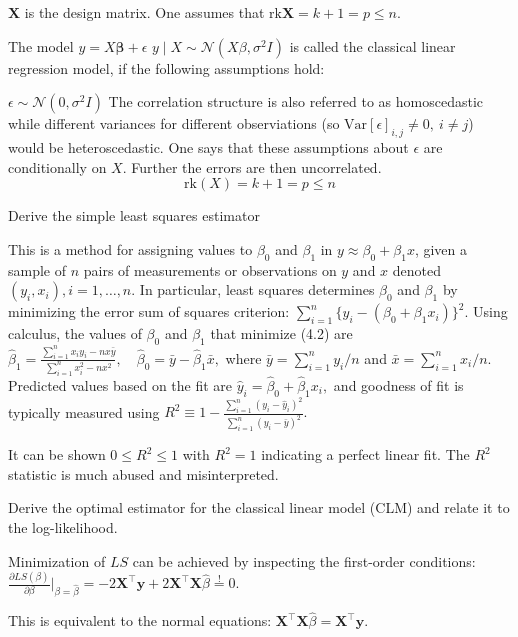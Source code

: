 \documentclass[11pt,a4paper,twoside]{article}
\begin{document}
\(\mathbf{X}\) is the design matrix. One assumes that \(\text{rk} \mathbf{X} = k + 1 = p \leq n\).


The model
\( y = X \boldsymbol{\beta} + \epsilon \)
\( y \mid X \sim \mathcal{N}(X\beta, \sigma^2 I)  \)
is called the classical linear regression model, if the following assumptions hold:

\( \epsilon \sim \mathcal{N}(0, \sigma^2 I) \)
The correlation structure is also referred to as homoscedastic
while different variances for different observiations (so \( \text{Var}[\epsilon]_{i,j} \neq 0,\ i \neq j \)) would be heteroscedastic.
One says that these assumptions about \( \epsilon \) are conditionally on \( X \).
Further the errors are then uncorrelated.
\[ \text{rk}(X) = k + 1 = p \leq n \]


Derive the simple least squares estimator

This is a method for assigning values to \(\beta_0\) and \(\beta_1\) in \( y \approx \beta_0 + \beta_1x \), 
given a sample of \(n\) pairs of measurements or observations on \(y\) and \(x\) denoted \((y_i, x_i), i = 1, \ldots, n.\)
In particular, least squares determines \(\beta_0\) and \(\beta_1\) by minimizing the error sum of squares criterion:
\(
\sum_{i=1}^{n} \{y_i - (\beta_0 + \beta_1 x_i)\}^2.
\)
Using calculus, the values of \(\beta_0\) and \(\beta_1\) that minimize (4.2) are 
\(
\hat{\beta}_1 = \frac{\sum_{i=1}^{n} x_i y_i - n x \bar{y}}{\sum_{i=1}^{n} x_i^2 - n x^2}, \quad \hat{\beta}_0 = \bar{y} - \hat{\beta}_1 \bar{x},
\)
where \(\bar{y} = \sum_{i=1}^{n} y_i / n\) and \(\bar{x} = \sum_{i=1}^{n} x_i / n\). 
Predicted values based on the fit are \(\hat{y}_i = \hat{\beta}_0 + \hat{\beta}_1 x_i,\) and goodness of fit is typically measured using
\(
R^2 \equiv 1 - \frac{\sum_{i=1}^{n} (y_i - \hat{y}_i)^2}{\sum_{i=1}^{n} (y_i - \bar{y})^2}.
\)

It can be shown \(0 \leq R^2 \leq 1\) with \(R^2 = 1\) indicating a perfect linear fit. 
The \(R^2\) statistic is much abused and misinterpreted.


Derive the optimal estimator for the classical linear model (CLM) and relate it to the log-likelihood.


Minimization of \(LS\) can be achieved by inspecting the first-order conditions: 
\(\frac{\partial LS(\beta)}{\partial \beta} \bigg|_{\beta = \hat{\beta}} = -2\mathbf{X}^\top \mathbf{y} + 2 \mathbf{X}^\top \mathbf{X} \hat{\beta} \stackrel{!}{=} 0.\)

This is equivalent to the normal equations: 
\(\mathbf{X}^\top \mathbf{X} \hat{\beta} = \mathbf{X}^\top \mathbf{y}.\)
\end{document}
